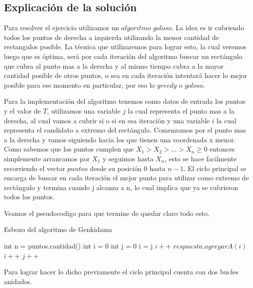 \subsection{Explicación de la solución}

Para resolver el ejercicio utilizamos un $algoritmo$ $goloso$. La idea es ir cubriendo todos los puntos de derecha a izquierda utilizando la menor cantidad de rectangulos posible. La técnica que utilizaremos para lograr esto, la cual veremos luego que es óptima, será por cada iteración del algoritmo buscar un rectángulo que cubra al punto mas a la derecha y al mismo tiempo cubra a la mayor cantidad posible de otros puntos, o sea en cada iteración intentará hacer lo mejor posible para ese momento en particular, por eso lo $greedy$ o $goloso$.

Para la implementación del algoritmo tenemos como datos de entrada los puntos y el valor de $T$, utilizamos una variable $j$ la cual representa el punto mas a la derecha, al cual vamos a cubrir si o si en esa iteración y una variable $i$ la cual representa el candidato a extremo del rectángulo. Comenzamos por el punto mas a la derecha y vamos siguiendo hacia los que tienen una coordenada x menor. Como sabemos que los puntos cumplen que $X_1 > X_2 > ... > X_n \geq 0$ entonces simplemente arrancamos por $X_1$ y seguimos hasta $X_n$, esto se hace facilmente recorriendo el vector $puntos$ desde su posición $0$ hasta $n-1$. El ciclo principal se encarga de buscar en cada iteración el mejor punto para utilizar como extremo de rectángulo y termina cuando j alcanza a n, lo cual implica que ya se cubrieron todos los puntos.

Veamos el pseudocodigo para que termine de quedar claro todo esto.

\begin{algorithm}[H]
\begin{algorithmic}
\caption{Esbozo del algoritmo de Genkidama}
	\State int n = puntos.cantidad()
	\State int i = 0
	\State int j = 0
    		\State i = j
			\State $ i++ $
	  	\EndWhile
		\State $respuesta.agregarA(i)$
		\State $ i++ $
			\State $ j++ $
	 	\EndWhile
  \EndWhile
  \EndProcedure
\end{algorithmic}
\end{algorithm}

Para lograr hacer lo dicho previamente el ciclo principal cuenta con dos bucles anidados.

